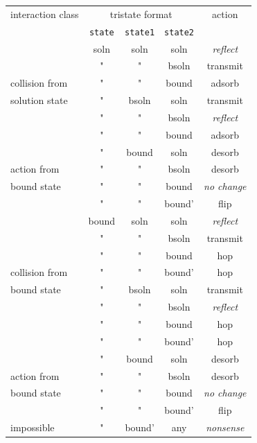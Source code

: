 \documentclass {scrbook}
\newcommand {\ttt} {\texttt}
\begin{document}
\begin{description}
\begin{longtable}[c]{l|ccc|c}
interaction class&\multicolumn{3}{c}{tristate format}&action\\
&\ttt{state}&\ttt{state1}&\ttt{state2}&\\
\hline
&soln&soln&soln&\emph{reflect}\\
&"&"&bsoln&transmit\\
collision from&"&"&bound&adsorb\\
solution state&"&bsoln&soln&transmit\\
&"&"&bsoln&\emph{reflect}\\
&"&"&bound&adsorb\\
\hline
&"&bound&soln&desorb\\
action from&"&"&bsoln&desorb\\
bound state&"&"&bound&\emph{no change}\\
&"&"&bound'&flip\\
\hline
&bound&soln&soln&\emph{reflect}\\
&"&"&bsoln&transmit\\
&"&"&bound&hop\\
collision from&"&"&bound'&hop\\
bound state&"&bsoln&soln&transmit\\
&"&"&bsoln&\emph{reflect}\\
&"&"&bound&hop\\
&"&"&bound'&hop\\
\hline
&"&bound&soln&desorb\\
action from&"&"&bsoln&desorb\\
bound state&"&"&bound&\emph{no change}\\
&"&"&bound'&flip\\
\hline
impossible&"&bound'&any&\emph{nonsense}\\
\end{longtable}


\end{description}
\end{document}
